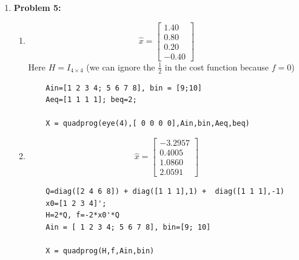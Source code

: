 \documentclass[letterpaper]{article}
\begin{document}
\begin{enumerate}
\begin{verbatim}
    syms x1 x2
    x=[x1;x2];
    F= [3;4]+[1 2; 3 4]*x - x*transpose(x)*[1;2]
    x0=1*[7;8]

    tic
    [xstar,count]=NewtonRaphson(F,x,x0)
    toc

    for k = 1:length(x0)
        Kay=num2str(k);
        eval(['x',Kay,'=xstar(k);']);
    end
    subs(F)

function [xstar,count]=NewtonRaphson(F,x,x0)
%
Jac=jacobian(F,x);Jac=simple(Jac);
xnew=x0;
epsilon=1;
err=1;
count=0;
while err>1e-8
    xold=xnew;
    for k = 1:length(x0)
        Kay=num2str(k);
        eval(['x',Kay,'=xold(k);'])
    end
    J=vpa(subs(Jac),10);
    Fval=vpa(subs(F),10);
    xnew=xold-epsilon*(J)\Fval;
    err=norm(double(xold-xnew));
    count=count+1;
    if count > 1e3, break, end
end
xstar=xnew;
end
\end{verbatim}

\item \noindent \textbf{Problem 5:}

\begin{enumerate}
\setlength{\itemsep}{.1in}
\renewcommand{\labelenumi}{(\alph{enumi})}
\item $$\widehat{x}=\left[ \begin{array}{r}1.40\\0.80\\0.20\\-0.40\end{array} \right]$$
Here $H=I_{4 \times 4}$ (we can ignore the $\frac{1}{2}$ in the cost function because $f=0$)
\begin{verbatim}
    Ain=[1 2 3 4; 5 6 7 8], bin = [9;10]
    Aeq=[1 1 1 1]; beq=2;

    X = quadprog(eye(4),[ 0 0 0 0],Ain,bin,Aeq,beq)
\end{verbatim}

\item $$\widehat{x}=\left[ \begin{array}{r}-3.2957\\0.4005\\1.0860\\2.0591\end{array} \right]$$
\begin{verbatim}
    Q=diag([2 4 6 8]) + diag([1 1 1],1) +  diag([1 1 1],-1)
    x0=[1 2 3 4]';
    H=2*Q, f=-2*x0'*Q
    Ain = [ 1 2 3 4; 5 6 7 8], bin=[9; 10]

    X = quadprog(H,f,Ain,bin)
    \end{verbatim}
\end{enumerate}


\end{enumerate}
\end{document}
